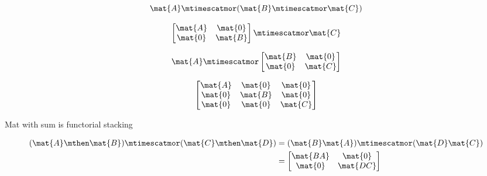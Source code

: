 {\begin{forslides}
    \begin{equation}
        \label{eq:parallelism-052}
        \mat{A} \mtimescatmor ( \mat{B} \mtimescatmor \mat{C} )
    \end{equation}

    \begin{equation}
        \label{eq:parallelism-053}
        \begin{bmatrix}
            \mat{A} & \mat{0} \\
            \mat{0} & \mat{B}
        \end{bmatrix}
        \mtimescatmor \mat{C}
    \end{equation}

    \begin{equation}
        \label{eq:parallelism-054}
        \mat{A} \mtimescatmor
        \begin{bmatrix}
            \mat{B} & \mat{0} \\
            \mat{0} & \mat{C}
        \end{bmatrix}
    \end{equation}

    \begin{equation}
        \label{eq:parallelism-055}
        \begin{bmatrix}
            \mat{A} & \mat{0} & \mat{0} \\
            \mat{0} & \mat{B} & \mat{0} \\
            \mat{0} & \mat{0} & \mat{C}
        \end{bmatrix}
    \end{equation}

    Mat with sum is functorial stacking

    \begin{align}\label{eq:parallelism-056}
        (\mat{A} \mthen \mat{B}) \mtimescatmor (\mat{C} \mthen \mat{D}) & = (\mat{B}\mat{A}) \mtimescatmor (\mat{D}\mat{C}) \\
                                                                        & =
        \begin{bmatrix}
            \mat{BA} & \mat{0}  \\
            \mat{0}  & \mat{DC}
        \end{bmatrix}
    \end{align}


\end{forslides}}

